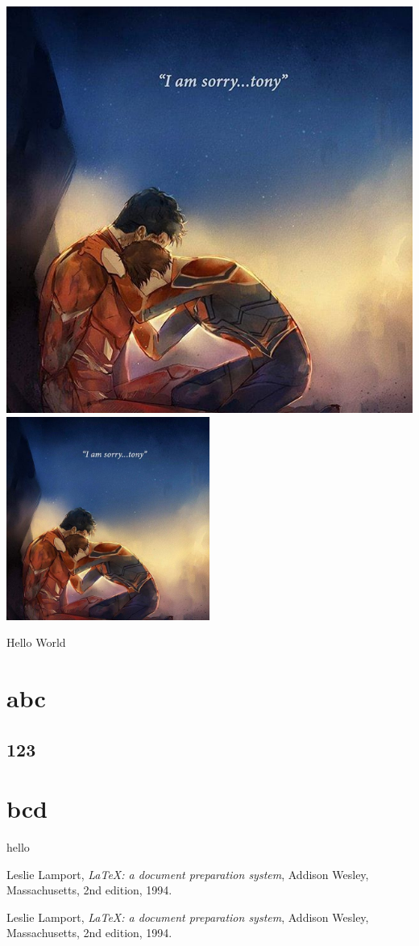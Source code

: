\documentclass[]{article}
\begin{document}
\begin{center}
\includegraphics[scale=0.5]{tonyspidy.jpg}
\includegraphics[width=0.5\textwidth]{tonyspidy.jpg}
\end{center}

Hello World\\
\begin{table}
\end{table}
\section{abc}
\subsection{123}
\section{bcd}
hello

\begin{thebibliography}{1}

  Leslie Lamport,
  \textit{\LaTeX: a document preparation system},
  Addison Wesley, Massachusetts,
  2nd edition,
  1994.
  
  Leslie Lamport,
  \textit{\LaTeX: a document preparation system},
  Addison Wesley, Massachusetts,
  2nd edition,
  1994.

\end{thebibliography}
\end{document}
